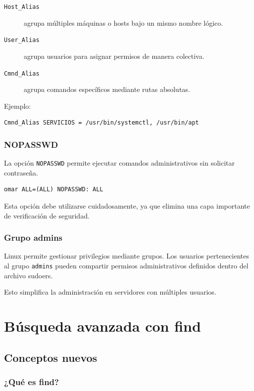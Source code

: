 \documentclass[11pt, letterpaper]{article}
\begin{document}
\begin{description}
\item[{\texttt{Host\_Alias}}] agrupa múltiples máquinas o hosts bajo un mismo nombre lógico.
\item[{\texttt{User\_Alias}}] agrupa usuarios para asignar permisos de manera colectiva.
\item[{\texttt{Cmnd\_Alias}}] agrupa comandos específicos mediante rutas absolutas.
\end{description}

Ejemplo:

\begin{verbatim}
Cmnd_Alias SERVICIOS = /usr/bin/systemctl, /usr/bin/apt
\end{verbatim}
\subsubsection{NOPASSWD}
\label{sec:org2148883}

La opción \texttt{NOPASSWD} permite ejecutar comandos administrativos sin solicitar contraseña.

\begin{verbatim}
omar ALL=(ALL) NOPASSWD: ALL
\end{verbatim}

Esta opción debe utilizarse cuidadosamente, ya que elimina una capa importante de verificación de seguridad.
\subsubsection{Grupo admins}
\label{sec:org000ea90}

Linux permite gestionar privilegios mediante grupos. Los usuarios pertenecientes al grupo \texttt{admins} pueden compartir permisos administrativos definidos dentro del archivo sudoers.

Esto simplifica la administración en servidores con múltiples usuarios.
\section{Búsqueda avanzada con find}
\label{sec:org917bd63}

\subsection{Conceptos nuevos}
\label{sec:orgfe73573}

\subsubsection{¿Qué es find?}
\label{sec:orgd372290}
\end{document}
